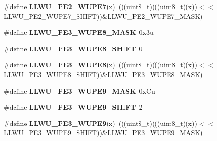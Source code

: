 \begin{DoxyCompactItemize}
\item 
\#define {\bfseries L\+L\+W\+U\+\_\+\+P\+E2\+\_\+\+W\+U\+P\+E7}(x)~(((uint8\+\_\+t)(((uint8\+\_\+t)(x))$<$$<$L\+L\+W\+U\+\_\+\+P\+E2\+\_\+\+W\+U\+P\+E7\+\_\+\+S\+H\+I\+FT))\&L\+L\+W\+U\+\_\+\+P\+E2\+\_\+\+W\+U\+P\+E7\+\_\+\+M\+A\+SK)\hypertarget{group__LLWU__Register__Masks_gaecb28f5285444e1576a192260d5c3048}{}\label{group__LLWU__Register__Masks_gaecb28f5285444e1576a192260d5c3048}

\item 
\#define {\bfseries L\+L\+W\+U\+\_\+\+P\+E3\+\_\+\+W\+U\+P\+E8\+\_\+\+M\+A\+SK}~0x3u\hypertarget{group__LLWU__Register__Masks_gabe7fce492e2c0201c4bb5af893f5a63d}{}\label{group__LLWU__Register__Masks_gabe7fce492e2c0201c4bb5af893f5a63d}

\item 
\#define {\bfseries L\+L\+W\+U\+\_\+\+P\+E3\+\_\+\+W\+U\+P\+E8\+\_\+\+S\+H\+I\+FT}~0\hypertarget{group__LLWU__Register__Masks_gaf02591badd7f37915120d0fd627cdf27}{}\label{group__LLWU__Register__Masks_gaf02591badd7f37915120d0fd627cdf27}

\item 
\#define {\bfseries L\+L\+W\+U\+\_\+\+P\+E3\+\_\+\+W\+U\+P\+E8}(x)~(((uint8\+\_\+t)(((uint8\+\_\+t)(x))$<$$<$L\+L\+W\+U\+\_\+\+P\+E3\+\_\+\+W\+U\+P\+E8\+\_\+\+S\+H\+I\+FT))\&L\+L\+W\+U\+\_\+\+P\+E3\+\_\+\+W\+U\+P\+E8\+\_\+\+M\+A\+SK)\hypertarget{group__LLWU__Register__Masks_gad6e40b93385848a0a6dc1177f884107a}{}\label{group__LLWU__Register__Masks_gad6e40b93385848a0a6dc1177f884107a}

\item 
\#define {\bfseries L\+L\+W\+U\+\_\+\+P\+E3\+\_\+\+W\+U\+P\+E9\+\_\+\+M\+A\+SK}~0x\+Cu\hypertarget{group__LLWU__Register__Masks_gad03733955d18194da002aeceedc2edf5}{}\label{group__LLWU__Register__Masks_gad03733955d18194da002aeceedc2edf5}

\item 
\#define {\bfseries L\+L\+W\+U\+\_\+\+P\+E3\+\_\+\+W\+U\+P\+E9\+\_\+\+S\+H\+I\+FT}~2\hypertarget{group__LLWU__Register__Masks_ga26cad28b7fe4fd2da53ece9d3744016c}{}\label{group__LLWU__Register__Masks_ga26cad28b7fe4fd2da53ece9d3744016c}

\item 
\#define {\bfseries L\+L\+W\+U\+\_\+\+P\+E3\+\_\+\+W\+U\+P\+E9}(x)~(((uint8\+\_\+t)(((uint8\+\_\+t)(x))$<$$<$L\+L\+W\+U\+\_\+\+P\+E3\+\_\+\+W\+U\+P\+E9\+\_\+\+S\+H\+I\+FT))\&L\+L\+W\+U\+\_\+\+P\+E3\+\_\+\+W\+U\+P\+E9\+\_\+\+M\+A\+SK)\hypertarget{group__LLWU__Register__Masks_ga644ab845edd61fbd851fca7254c6a3f0}{}\label{group__LLWU__Register__Masks_ga644ab845edd61fbd851fca7254c6a3f0}


\end{DoxyCompactItemize}
